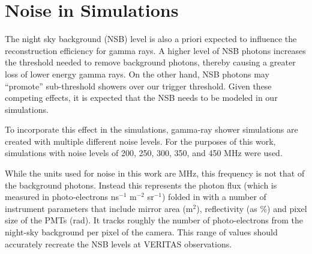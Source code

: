 \documentclass[main.tex]{subfiles}
\begin{document}
\section{Noise in Simulations}
The night sky background (NSB) level is also a priori expected to influence the reconstruction efficiency for gamma rays. A higher level of NSB photons increases the threshold needed to remove background photons, thereby causing a greater loss of lower energy gamma rays. On the other hand, NSB photons may ``promote'' sub-threshold showers over our trigger threshold. Given these competing effects, it is expected that the NSB needs to be modeled in our simulations.

To incorporate this effect in the simulations, gamma-ray shower simulations are created with multiple different noise levels. For the purposes of this work, simulations with noise levels of 200, 250, 300, 350, and 450 MHz were used.

While the units used for noise in this work are MHz, this frequency is not that of the background photons. Instead this represents the photon flux (which is measured in photo-electrons ns$^{-1}$ m$^{-2}$ sr$^{-1}$) folded in with a number of instrument parameters that include mirror area (m$^2$), reflectivity (as \%) and pixel size of the PMTs (rad). It tracks roughly the number of photo-electrons from the night-sky background per pixel of the camera. This range of values should accurately recreate the NSB levels at VERITAS observations.
\end{document}
